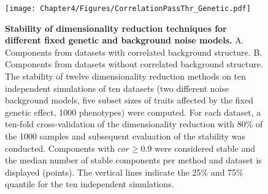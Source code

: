 \begin{figure}[hbtp]
	\centering
	\texttt{[image: Chapter4/Figures/CorrelationPassThr\_Genetic.pdf]}
\caption[\textbf{Stability of dimensionality reduction techniques for different fixed genetic and background noise models.}]{\textbf{Stability of dimensionality reduction techniques for different fixed genetic and background noise models. }A. Components from datasets with correlated background structure. B. Components from datasets without correlated background structure. The stability of twelve dimensionality reduction methods on ten independent simulations of ten datasets (two different noise background models, five subset sizes of traits affected by the fixed genetic effect, \num{1000} phenotypes) were computed.  For each dataset, a ten-fold cross-validation of the dimensionality reduction with \num{80}\% of the \num{1000} samples and subsequent evaluation of the stability was conducted. Components with \(cor \ge 0.9\) were considered stable and the median number of stable components per method and dataset is displayed (points). The vertical lines indicate the \num{25}\% and \num{75}\% quantile for the ten independent simulations. } 
	 	\label{fig:cor-genetic}
\end{figure}

